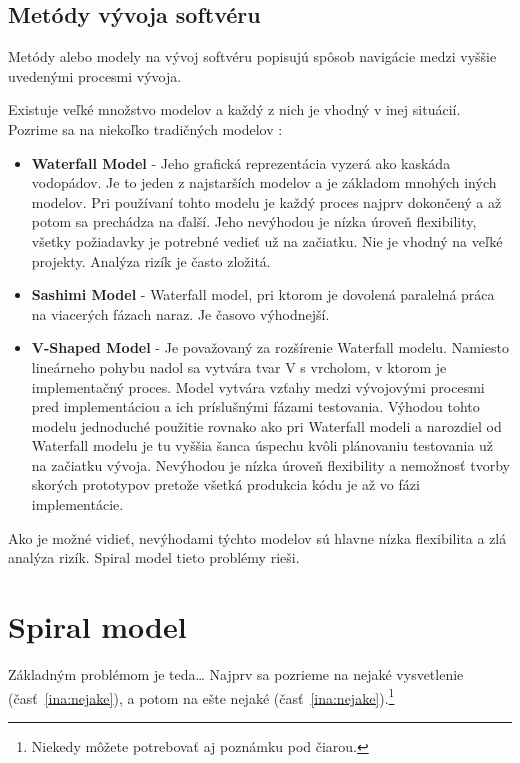 \documentclass[10pt,twoside,slovak,a4paper]{article}
\begin{document}
\subsection{Metódy vývoja softvéru} \label{metody:vyvojSoftveru}
Metódy alebo modely na vývoj softvéru popisujú spôsob navigácie medzi vyššie uvedenými procesmi vývoja.\cite{ModelDef}

Existuje veľké množstvo modelov a každý z nich je vhodný v inej situácií. Pozrime sa na niekoľko tradičných modelov \cite{Methodologies}:
\begin{itemize}
\item \textbf{Waterfall Model} - Jeho grafická reprezentácia vyzerá ako kaskáda vodopádov. Je to jeden z najstarších modelov a je základom mnohých iných modelov. Pri používaní tohto modelu je každý proces najprv dokončený a až potom sa prechádza na ďalší. Jeho nevýhodou je nízka úroveň flexibility, všetky požiadavky je potrebné vedieť už na začiatku. Nie je vhodný na veľké projekty. Analýza rizík je často zložitá.
\item \textbf{Sashimi Model} - Waterfall model, pri ktorom je dovolená paralelná práca na viacerých fázach naraz. Je časovo výhodnejší.
\item \textbf{V-Shaped Model} - Je považovaný za rozšírenie Waterfall modelu. Namiesto lineárneho pohybu nadol sa vytvára tvar V s vrcholom, v ktorom je implementačný proces. Model vytvára vzťahy medzi vývojovými procesmi pred implementáciou a ich príslušnými fázami testovania. Výhodou tohto modelu jednoduché použitie rovnako ako pri Waterfall modeli a narozdiel od Waterfall modelu je tu vyššia šanca úspechu kvôli plánovaniu testovania už na začiatku vývoja. Nevýhodou je nízka úroveň flexibility a nemožnosť tvorby skorých prototypov pretože všetká produkcia kódu je až vo fázi implementácie.
\end{itemize}

Ako je možné vidieť, nevýhodami týchto modelov sú hlavne nízka flexibilita a zlá analýza rizík. Spiral model tieto problémy rieši.

\section{Spiral model} \label{spiralModel}

Základným problémom je teda\ldots{} Najprv sa pozrieme na nejaké vysvetlenie (časť~\ref{ina:nejake}), a potom na ešte nejaké (časť~\ref{ina:nejake}).\footnote{Niekedy môžete potrebovať aj poznámku pod čiarou.}
\end{document}
